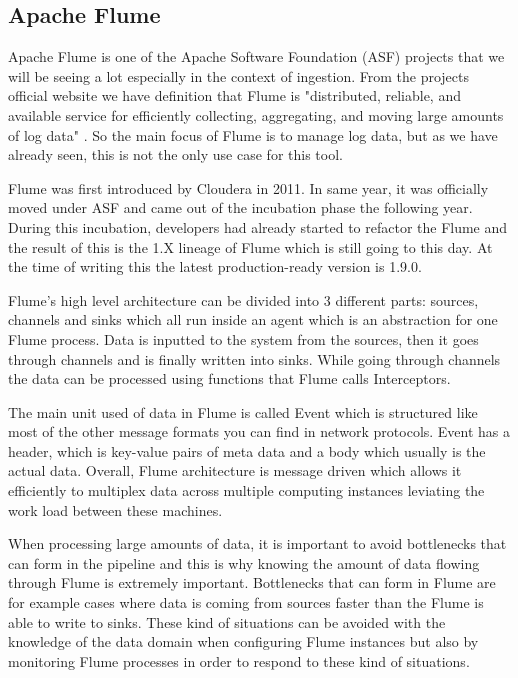 \subsection{Apache Flume}

Apache Flume is one of the Apache Software Foundation (ASF) projects that we will be seeing a lot especially in the context of ingestion.
From the projects official website we have definition that Flume is "distributed, reliable, and available service for efficiently collecting, aggregating, and moving large amounts of log data" \cite{flume}.
So the main focus of Flume is to manage log data, but as we have already seen, this is not the only use case for this tool.

Flume was first introduced by Cloudera in 2011.
In same year, it was officially moved under ASF and came out of the incubation phase the following year.
During this incubation, developers had already started to refactor the Flume and the result of this is the 1.X lineage of Flume which is still going to this day. \cite{hoffman}
At the time of writing this the latest production-ready version is 1.9.0.

Flume's high level architecture can be divided into 3 different parts: sources, channels and sinks which all run inside an agent which is an abstraction for one Flume process.
Data is inputted to the system from the sources, then it goes through channels and is finally written into sinks. 
While going through channels the data can be processed using functions that Flume calls Interceptors. \cite{hoffman}

The main unit used of data in Flume is called Event which is structured like most of the other message formats you can find in network protocols.
Event has a header, which is key-value pairs of meta data and a body which usually is the actual data. 
Overall, Flume architecture is message driven which allows it efficiently to multiplex data across multiple computing instances leviating the work load between these machines. \cite{hoffman}

When processing large amounts of data, it is important to avoid bottlenecks that can form in the pipeline and this is why knowing the amount of data flowing through Flume is extremely important.
Bottlenecks that can form in Flume are for example cases where data is coming from sources faster than the Flume is able to write to sinks.
These kind of situations can be avoided with the knowledge of the data domain when configuring Flume instances but also by monitoring Flume processes in order to respond to these kind of situations. \cite{hoffman}

